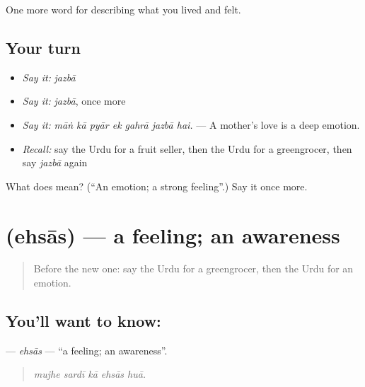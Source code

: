 \begin{grammarlens}[title={What you've built}]
One more word for describing what you lived and felt.
\end{grammarlens}

\subsection*{Your turn}
\begin{itemize}
\raggedright
  \item \emph{Say it:} \emph{jazbā}
  \item \emph{Say it:} \emph{jazbā}, once more
  \item \emph{Say it:} \emph{māṅ kā pyār ek gahrā jazbā hai.} — A mother's love is a deep emotion.
  \item \emph{Recall:} say the Urdu for a fruit seller, then the Urdu for a greengrocer, then say \emph{jazbā} again
\end{itemize}

\begin{tcolorbox}[breakable,colback=teal!4,colframe=teal!35!black,title={Before you move on}]
What does  mean? (\textquotedblleft{}An emotion; a strong feeling\textquotedblright{}.) Say it once more.
\end{tcolorbox}
\section[\texorpdfstring{\ur{احساس} (ehsās)}{احساس (ehsās)}]{ (ehsās) — a feeling; an awareness}

\label{lesson:UR-C440-ehsas}



\begin{quote}
Before the new one: say the Urdu for a greengrocer, then the Urdu for an emotion.
\end{quote}

\subsection*{You'll want to know: }
\textbf{} — \emph{ehsās} — \textquotedblleft{}a feeling; an awareness\textquotedblright{}.

\begin{quote}
    
\end{quote}

\begin{quote}
\emph{mujhe sardī kā ehsās huā.}
\end{quote}


